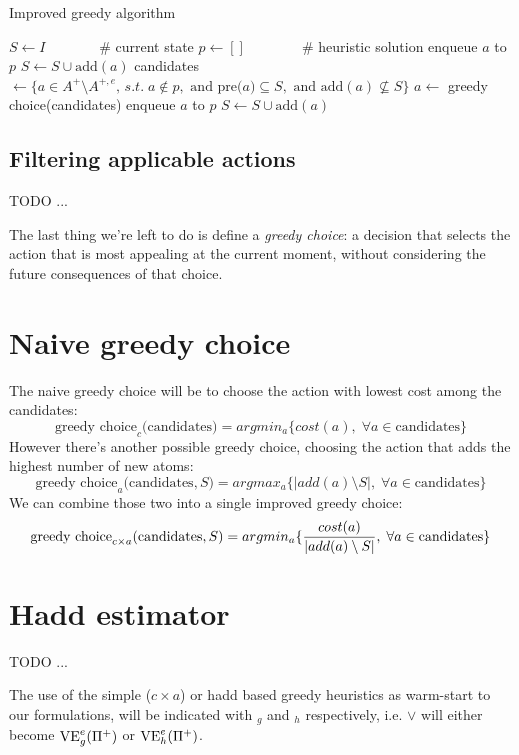 \begin{algorithm}[h]
    \caption{Improved greedy algorithm}
    \begin{algorithmic}
        \State $S\gets I\qquad\quad\;\;\;$\# current state
        \State $p\gets []\qquad\qquad$\# heuristic solution
                \State enqueue $a$ to $p$
                \State $S\gets S\cup\mbox{add}(a)$
            \Else
                \State candidates $\gets\{a\in A^+\setminus A^{+,e},\,s.t.\;a\not\in p,\mbox{ and pre(}a)\subseteq S,\mbox{ and add}(a)\not\subseteq S\}$
                \State $a\gets$ greedy choice(candidates)
                \State enqueue $a$ to $p$
                \State $S\gets S\cup\mbox{add}(a)$
            \EndIf
        \EndWhile
    \end{algorithmic}
\end{algorithm}

\subsection{Filtering applicable actions}

TODO ...

The last thing we're left to do is define a \textit{greedy choice}: a decision that selects the action that is most appealing at the current moment, without considering the future consequences of that choice.

\section{Naive greedy choice}
The naive greedy choice will be to choose the action with lowest cost among the candidates:
$$\mbox{greedy choice}_c\mbox{(candidates)}=argmin_a\{cost(a),\;\forall a\in\mbox{candidates}\}$$
However there's another possible greedy choice, choosing the action that adds the highest number of new atoms:
$$\mbox{greedy choice}_a\mbox{(candidates},S)=argmax_a\{|add(a)\setminus S|,\;\forall a\in\mbox{candidates}\}$$
We can combine those two into a single improved greedy choice:
$$\mbox{greedy choice}_{c\times a}\mbox{(candidates},S)=argmin_a\{{cost(a)\over|add(a)\setminus S|},\;\forall a\in\mbox{candidates}\}$$

\section{Hadd estimator}

TODO ...

The use of the simple ($c\times a$) or hadd based greedy heuristics as warm-start to our formulations, will be indicated with $_g$ and $_h$ respectively, i.e. $\vee$ will either become $\mbox{VE}^e_g(\Pi^+)$ or $\mbox{VE}^e_h(\Pi^+)$.